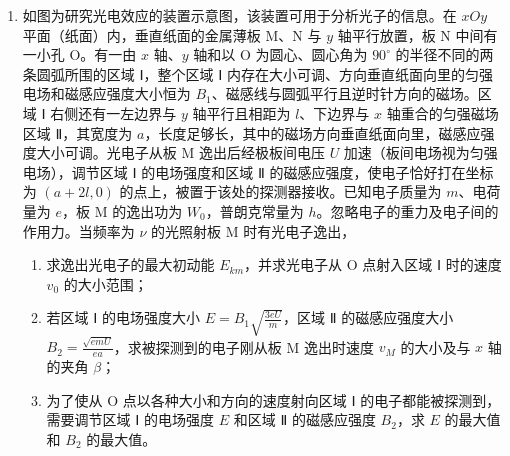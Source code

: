 \documentclass[\gkver]{gaokaozhenti}
\begin{document}
\begin{enumerate}
\item
如图为研究光电效应的装置示意图，该装置可用于分析光子的信息。在 $xOy$ 平面（纸面）内，垂直纸面的金属薄板 M、N 与 $y$ 轴平行放置，板 N 中间有一小孔 O。有一由 $x$ 轴、$y$ 轴和以 O 为圆心、圆心角为 $90^{\circ}$ 的半径不同的两条圆弧所围的区域 Ⅰ，整个区域 Ⅰ 内存在大小可调、方向垂直纸面向里的匀强电场和磁感应强度大小恒为 $B_{1}$、磁感线与圆弧平行且逆时针方向的磁场。区域 Ⅰ 右侧还有一左边界与 $y$ 轴平行且相距为 $l$、下边界与 $x$ 轴重合的匀强磁场区域 Ⅱ，其宽度为 $a$，长度足够长，其中的磁场方向垂直纸面向里，磁感应强度大小可调。光电子从板 M 逸出后经极板间电压 $U$ 加速（板间电场视为匀强电场），调节区域 Ⅰ 的电场强度和区域 Ⅱ 的磁感应强度，使电子恰好打在坐标为 $(a+2l,0)$ 的点上，被置于该处的探测器接收。已知电子质量为 $m$、电荷量为 $e$，板 M 的逸出功为 $W_{0}$，普朗克常量为 $h$。忽略电子的重力及电子间的作用力。当频率为 $\nu$ 的光照射板 M 时有光电子逸出，


\begin{enumerate}
	\item
	求逸出光电子的最大初动能 $E_{km}$，并求光电子从 O 点射入区域 Ⅰ 时的速度 $v_{0}$ 的大小范围；

	\item
	若区域 Ⅰ 的电场强度大小 $E=B_{1}\sqrt{\frac{3eU}{m}}$，区域 Ⅱ 的磁感应强度大小 $B_{2}=\frac{\sqrt{emU}}{ea}$，求被探测到的电子刚从板 M 逸出时速度 $v_{M}$ 的大小及与 $x$ 轴的夹角 $\beta$；

	\item
	为了使从 O 点以各种大小和方向的速度射向区域 Ⅰ 的电子都能被探测到，需要调节区域 Ⅰ 的电场强度 $E$ 和区域 Ⅱ 的磁感应强度 $B_{2}$，求 $E$ 的最大值和 $B_{2}$ 的最大值。
\end{enumerate}

\end{enumerate}
\end{document}
